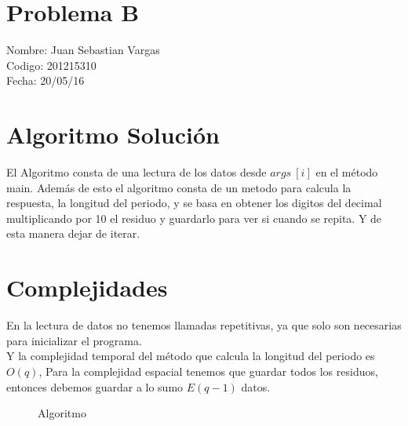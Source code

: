\documentclass{article}
\begin{document}
\section*{Problema B}
Nombre: Juan Sebastian Vargas\\
 Codigo: 201215310\\
Fecha: 20/05/16

\section{Algoritmo Soluci\'on}
El Algoritmo consta de una lectura de los datos desde $args\ [i]$ en el método main. Además de esto el algoritmo consta de un metodo para calcula la respuesta, la longitud del periodo, y se basa en obtener los digitos del decimal  multiplicando por 10 el residuo y guardarlo para ver si cuando se repita. Y de esta manera dejar de iterar. 

\section{Complejidades}
En la lectura de datos no tenemos llamadas repetitivas, ya que solo son necesarias para inicializar el programa. \\
Y la complejidad temporal del método que calcula la longitud del periodo es $O(q)$,
Para la complejidad espacial tenemos que guardar todos los residuos, entonces debemos guardar a lo sumo $E(q-1)$ datos.
 

\begin{figure}[h]

 \label{Al}
 \caption{Algoritmo}
\end{figure}
\end{document}
